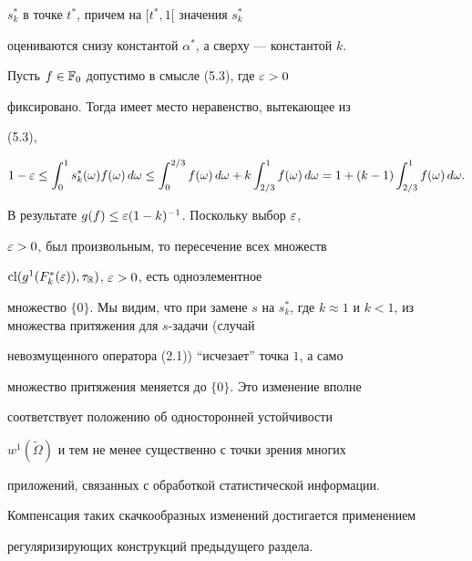 $s^*_k$ в точке $t^*$, причем на $[t^*,1[$ значения $s^*_k$


оцениваются снизу константой $\alpha^*$, а сверху --- константой $k$.


Пусть $f \in \Bbb F_0$ допустимо в смысле (5.3), где $\varepsilon>0$


фиксировано. Тогда имеет место неравенство, вытекающее из


(5.3),


%


$$


1-\var \le \int_0^1 s^*_k(\omega)f(\omega)\,d\omega \le


\int_0^{2/3}f(\omega)\,d\omega+


k\int^1_{2/3}f(\omega)\,d\omega=


1+(k-1)\int^1_{2/3}f(\omega)\,d\omega.


$$


В результате $g(f) \le \varepsilon(1-k)^{-1}$. Поскольку выбор $\varepsilon$,


$\varepsilon>0$, был произвольным, то пересечение всех множеств


$\operatorname{cl}(g^1(F^*_k(\varepsilon)),\tau_{\Bbb R})$, $\varepsilon>0$, есть одноэлементное


множество $\{0\}$. Мы видим, что при замене $s$ на $s^*_k$, где $k


\approx 1$ и $k < 1$, из множества притяжения для $s$-задачи (случай


невозмущенного оператора (2.1)) ``исчезает'' точка $1$, а само


множество притяжения меняется до $\{0\}$. Это изменение вполне


соответствует положению об односторонней устойчивости


$w^1(\tilde\Omega)$ и тем не менее существенно с точки зрения многих


приложений, связанных с обработкой статистической информации.


Компенсация таких скачкообразных изменений достигается применением


регуляризирующих конструкций предыдущего раздела.





